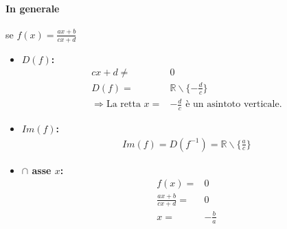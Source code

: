 \documentclass[../main.tex]{subfiles}
\begin{document}
\paragraph{In generale}
se $f(x) = \frac{ax + b}{cx + d}$
\begin{itemize}
    \item \textbf{$D(f)$:} \begin{align*}
        cx + d \neq& 0 \\
        D(f) =&\mathbb{R}\backslash \{ -\frac{d}{c}\} \\
        \Rightarrow \text{La retta } x =& -\frac{d}{c} \text{ è un asintoto verticale.}
    \end{align*} 
    \item \textbf{$Im(f)$:} \begin{align*}
        Im(f) = D(f^{-1}) = \mathbb{R}\backslash\{ \frac{a}{c}\}
    \end{align*}
    \item \textbf{$\cap$ asse $x$:} \begin{align*}
        f(x) =& 0 \\
        \frac{ax + b}{cx + d} =& 0 \\
        x =& -\frac{b}{a}
    \end{align*}
\end{itemize}
\end{document}
